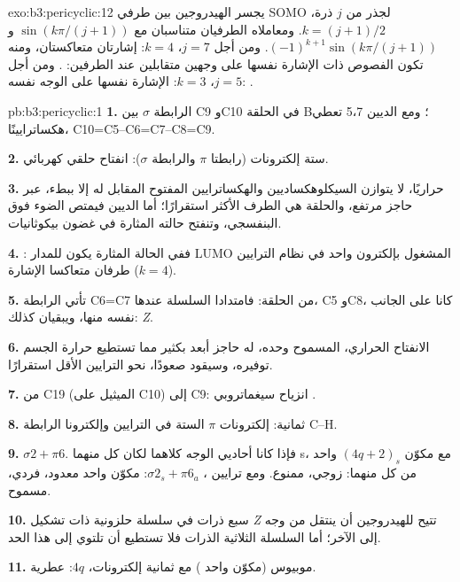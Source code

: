 \begin{solution}{exo:b3:pericyclic:12}
يجسر الهيدروجين بين طرفي SOMO لجذر من $j$ ذرة، $k = (j + 1)/2$. ومعاملاه
الطرفيان متناسبان مع $\sin(k\pi/(j + 1))$ و$(-1)^{k+1}\sin(k\pi/(j + 1))$. ومن أجل $j = 7$، $k = 4$: إشارتان متعاكستان، ومنه
تكون الفصوص ذات الإشارة نفسها على وجهين متقابلين عند الطرفين: . ومن أجل
$j = 5$، $k = 3$: الإشارة نفسها على الوجه نفسه: .
\end{solution}

\begin{solution}{pb:b3:pericyclic:1}
\textbf{1.} الرابطة $\sigma$ بين C9 وC10 في الحلقة B؛ ومع الديين 5،7 تعطي هكساترايينًا،
C10=C5--C6=C7--C8=C9.

\textbf{2.} ستة إلكترونات (رابطتا $\pi$ والرابطة $\sigma$): انفتاح حلقي كهربائي.

\textbf{3.} حراريًا، لا يتوازن السيكلوهكساديين والهكساترايين المفتوح المقابل له إلا
ببطء، عبر حاجز مرتفع، والحلقة هي الطرف الأكثر استقرارًا؛ أما
الديين فيمتص الضوء فوق البنفسجي، وتنفتح حالته المثارة في غضون
بيكوثانيات.

\textbf{4.} : ففي الحالة المثارة يكون للمدار LUMO المشغول بإلكترون واحد في
نظام الترايين ($k = 4$) طرفان متعاكسا الإشارة.

\textbf{5.} تأتي الرابطة C6=C7 من الحلقة: فامتدادا السلسلة عندها، C5 وC8،
كانا على الجانب نفسه منها، ويبقيان كذلك: \textit{Z}.

\textbf{6.} الانفتاح الحراري، المسموح  وحده، له حاجز أبعد بكثير مما
تستطيع حرارة الجسم توفيره، وسيقود صعودًا، نحو الترايين الأقل استقرارًا.

\textbf{7.} من C19 (الميثيل على C10) إلى C9: انزياح سيغماتروبي .

\textbf{8.} ثمانية: إلكترونات $\pi$ الستة في الترايين وإلكترونا الرابطة C--H.

\textbf{9.} $\sigma2 + \pi6$. فإذا كانا أحاديي الوجه كلاهما لكان كل منهما s، مع مكوّن $(4q + 2)_s$ واحد من كل منهما:
زوجي، ممنوع. ومع ترايين ، $\sigma2_s + \pi6_a$: مكوّن واحد معدود، فردي،
مسموح.

\textbf{10.} سبع ذرات في سلسلة حلزونية ذات تشكيل \textit{Z} تتيح للهيدروجين أن ينتقل من وجه إلى
الآخر؛ أما السلسلة الثلاثية الذرات فلا تستطيع أن تلتوي إلى هذا الحد.

\textbf{11.} موبيوس (مكوّن واحد ) مع ثمانية إلكترونات، $4q$: عطرية.


\end{solution}
